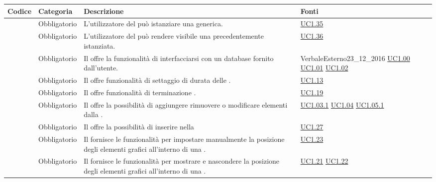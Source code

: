 \begin{longtable}{|P{1.5cm}|P{2.5cm}|P{6.5cm}|P{2.5cm}|}
	\hline \textbf{Codice} & \textbf{Categoria} & \textbf{Descrizione} & \textbf{Fonti} \\
	\hline \RequisitoObF\label{L6} & Obbligatorio & L'utilizzatore del  può istanziare una  generica. & \hyperref[UC1.35]{UC1.35} \\
	\hline \RequisitoObF\label{L7} & Obbligatorio & L'utilizzatore del  può rendere visibile una  precedentemente istanziata. & \hyperref[UC1.36]{UC1.36} \\
	\hline \RequisitoObF\label{L8} & Obbligatorio & Il  offre la funzionalità di interfacciarsi con un database  fornito dall'utente. & VerbaleEsterno23\_12\_2016 \linebreak \hyperref[UC1.00]{UC1.00} \linebreak \hyperref[UC1.01]{UC1.01} \hyperref[UC1.02]{UC1.02} \\
	\hline \RequisitoObF\label{L9} & Obbligatorio & Il  offre funzionalità di settaggio di durata delle . & \hyperref[UC1.13]{UC1.13} \\
	\hline \RequisitoObF\label{L10} & Obbligatorio & Il  offre funzionalità di terminazione . & \hyperref[UC1.19]{UC1.19} \\
	\hline \RequisitoObF\label{L11} & Obbligatorio & Il  offre la possibilità di aggiungere rimuovere o modificare elementi dalla . & \hyperref[UC1.03.1]{UC1.03.1} \hyperref[UC1.04]{UC1.04} \hyperref[UC1.05.1]{UC1.05.1} \\
	\hline \RequisitoObF\label{L12} & Obbligatorio & Il  offre la possibilità di inserire  nella  & \hyperref[UC1.27]{UC1.27} \\
	\hline \RequisitoObF\label{L13} & Obbligatorio & Il  fornisce le funzionalità per impostare manualmente la posizione degli elementi grafici all'interno di una . & \hyperref[UC1.23]{UC1.23} \\
	\hline \RequisitoObF\label{L14} & Obbligatorio & Il  fornisce le funzionalità per mostrare e nascondere la posizione degli elementi grafici all'interno di una . & \hyperref[UC1.21]{UC1.21} \linebreak \hyperref[UC1.22]{UC1.22} \\

\end{longtable}
